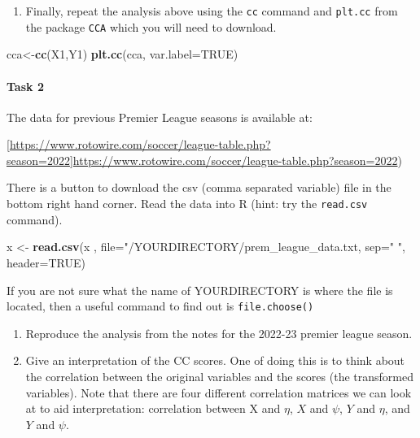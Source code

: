\documentclass[
]{book}
\newenvironment{Shaded}{\begin{snugshade}}{\end{snugshade}}
\newcommand{\AttributeTok}[1]{\textcolor[rgb]{0.13,0.29,0.53}{#1}}
\newcommand{\ConstantTok}[1]{\textcolor[rgb]{0.56,0.35,0.01}{#1}}
\newcommand{\FunctionTok}[1]{\textcolor[rgb]{0.13,0.29,0.53}{\textbf{#1}}}
\newcommand{\NormalTok}[1]{#1}
\newcommand{\OtherTok}[1]{\textcolor[rgb]{0.56,0.35,0.01}{#1}}
\newcommand{\StringTok}[1]{\textcolor[rgb]{0.31,0.60,0.02}{#1}}
\providecommand{\tightlist}{%
  \setlength{\itemsep}{0pt}\setlength{\parskip}{0pt}}
\theoremstyle{definition}
\theoremstyle{definition}
\theoremstyle{definition}
\theoremstyle{definition}
\theoremstyle{remark}
\begin{document}
\begin{enumerate}
\def\labelenumi{\roman{enumi}.}
\setcounter{enumi}{5}
\tightlist
\item
  Finally, repeat the analysis above using the \texttt{cc} command and \texttt{plt.cc} from the package \texttt{CCA} which you will need to download.
\end{enumerate}

\begin{Shaded}
\begin{Highlighting}[]
\NormalTok{cca}\OtherTok{\textless{}{-}}\FunctionTok{cc}\NormalTok{(X1,Y1)}
\FunctionTok{plt.cc}\NormalTok{(cca, }\AttributeTok{var.label=}\ConstantTok{TRUE}\NormalTok{)}
\end{Highlighting}
\end{Shaded}

\hypertarget{task-2}{%
\paragraph*{Task 2}\label{task-2}}

The data for previous Premier League seasons is available at:

{[}\url{https://www.rotowire.com/soccer/league-table.php?season=2022}{]}\url{https://www.rotowire.com/soccer/league-table.php?season=2022})

There is a button to download the csv (comma separated variable) file in the bottom right hand corner. Read the data into R (hint: try the \texttt{read.csv} command).

\begin{Shaded}
\begin{Highlighting}[]
\NormalTok{x }\OtherTok{\textless{}{-}} \FunctionTok{read.csv}\NormalTok{(x , }\AttributeTok{file=}\StringTok{"/YOURDIRECTORY/prem\_league\_data.txt, }
\StringTok{sep="} \StringTok{", header=TRUE)}
\end{Highlighting}
\end{Shaded}

If you are not sure what the name of YOURDIRECTORY is where the file is located, then a useful command to find out is \texttt{file.choose()}

\begin{enumerate}
\def\labelenumi{\roman{enumi}.}
\item
  Reproduce the analysis from the notes for the 2022-23 premier league season.
\item
  Give an interpretation of the CC scores. One of doing this is to think about the correlation between the original variables and the scores (the transformed variables). Note that there are four different correlation matrices we can look at to aid interpretation: correlation between X and \(\eta\), \(X\) and \(\psi\), \(Y\) and \(\eta\), and \(Y\) and \(\psi\).
\end{enumerate}
\end{document}
